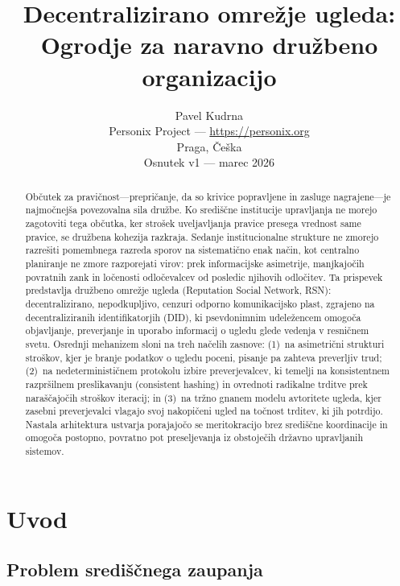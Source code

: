 \documentclass[11pt,a4paper,twocolumn]{article}
\title{\textbf{Decentralizirano omrežje ugleda:\\Ogrodje za naravno družbeno organizacijo}}
\author{Pavel Kudrna\\Personix Project --- \url{https://personix.org}\\Praga, Češka\\Osnutek v1 --- marec 2026}
\date{}
\begin{document}
\maketitle

\begin{abstract}
Občutek za pravičnost---prepričanje, da so krivice popravljene in zasluge nagrajene---je najmočnejša povezovalna sila družbe. Ko središčne institucije upravljanja ne morejo zagotoviti tega občutka, ker strošek uveljavljanja pravice presega vrednost same pravice, se družbena kohezija razkraja. Sedanje institucionalne strukture ne zmorejo razrešiti pomembnega razreda sporov na sistematično enak način, kot centralno planiranje ne zmore razporejati virov: prek informacijske asimetrije, manjkajočih povratnih zank in ločenosti odločevalcev od posledic njihovih odločitev. Ta prispevek predstavlja družbeno omrežje ugleda (Reputation Social Network, RSN): decentralizirano, nepodkupljivo, cenzuri odporno komunikacijsko plast, zgrajeno na decentraliziranih identifikatorjih (DID), ki psevdonimnim udeležencem omogoča objavljanje, preverjanje in uporabo informacij o ugledu glede vedenja v resničnem svetu. Osrednji mehanizem sloni na treh načelih zasnove: (1)~na asimetrični strukturi stroškov, kjer je branje podatkov o ugledu poceni, pisanje pa zahteva preverljiv trud; (2)~na nedeterminističnem protokolu izbire preverjevalcev, ki temelji na konsistentnem razpršilnem preslikavanju (consistent hashing) in ovrednoti radikalne trditve prek naraščajočih stroškov iteracij; in (3)~na tržno gnanem modelu avtoritete ugleda, kjer zasebni preverjevalci vlagajo svoj nakopičeni ugled na točnost trditev, ki jih potrdijo. Nastala arhitektura ustvarja porajajočo se meritokracijo brez središčne koordinacije in omogoča postopno, povratno pot preseljevanja iz obstoječih državno upravljanih sistemov.
\end{abstract}

\section{Uvod}

\subsection{Problem središčnega zaupanja}
\end{document}
